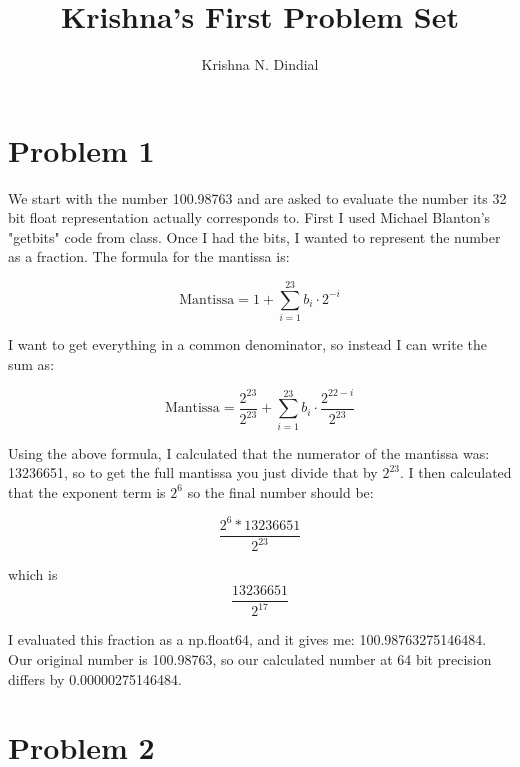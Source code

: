 \documentclass[11pt]{article}
\title{Krishna's First Problem Set}
\author{Krishna N. Dindial}
\begin{document}
\maketitle


\section{Problem 1}
We start with the number 100.98763 and are asked to evaluate the number its 32 bit float representation actually corresponds to.
First I used Michael Blanton's "getbits" code from class. Once I had the bits, I wanted to represent the number as a fraction. The formula for the mantissa is: 

\begin{equation}
\text{Mantissa} = 1 + \sum_{i=1}^{23} b_i \cdot 2^{-i}
\end{equation}

I want to get everything in a common denominator, so instead I can write the sum as: 


\begin{equation}
\text{Mantissa} = \frac{2^{23}}{2^{23}} + \sum_{i=1}^{23} b_i \cdot \frac{2^{22-i}}{2^{23}}
\end{equation}

Using the above formula, I calculated that the numerator of the mantissa was: 13236651, so to get the full mantissa you just divide that by $2^{23}$. I then calculated that the exponent term is $2^6$ so the final number should be:

\begin{equation}
    \frac{2^6*13236651}{2^{23}}
\end{equation}

which is 
\begin{equation}
    \frac{13236651}{2^{17}}
\end{equation}

I evaluated this fraction as a np.float64, and it gives me: 100.98763275146484. Our original number is 100.98763, so our calculated number at 64 bit precision differs by 0.00000275146484.



\section{Problem 2}
\end{document}
